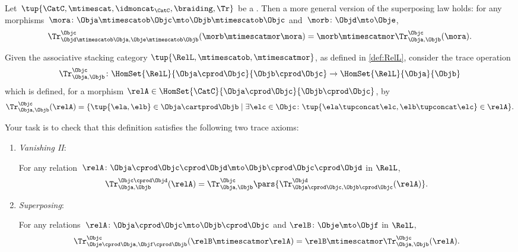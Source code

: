 \begin{lemma}
    \label{lem:general-superposing-law}
    Let~$\tup{\CatC, \mtimescat,\idmoncat_{\CatC}, \braiding, \Tr}$ be a .
    Then a more general version of the superposing law holds: for any morphisms~$\mora\colon \Obja\mtimescatob \Objc \mto \Objb \mtimescatob \Objc$ and~$\morb \colon \Objd \mto \Obje$,
    \begin{equation}
        \label{eq:superposing_2}
        \Tr_{\Objd\mtimescatob \Obja,\Obje\mtimescatob \Objb}^{\Objc}(\morb \mtimescatmor \mora)=\morb \mtimescatmor \Tr_{\Obja,\Objb}^\Objc(\mora).
    \end{equation}
\end{lemma}
\missingproof


\begin{gradedexercise}
    \label{eq:TracingRelations}

    Given the associative stacking category $\tup{\RelL, \mtimescatob, \mtimescatmor}$, as defined in \cref{def:RelL}, consider the trace operation
    $$\Tr_{\Obja,\Objb}^\Objc \colon \HomSet{\RelL}{\Obja \cprod \Objc}{\Objb \cprod \Objc}\to \HomSet{\RelL}{\Obja}{\Objb}$$
    which is defined, for a morphism $\relA \in \HomSet{\CatC}{\Obja \cprod \Objc}{\Objb\cprod \Objc}$, by
    \begin{equation}
        \Tr_{\Obja,\Objb}^\Objc(\relA) = \{ \tup{\ela, \elb} \in \Obja \cartprod \Objb \mid \exists \elc \in \Objc \colon \tup{\ela \tupconcat \elc, \elb \tupconcat \elc} \in \relA \}.
    \end{equation}

    Your task is to check that this definition satisfies the following two trace axioms:

    \begin{enumerate}

        \item \emph{Vanishing II}:

              For any relation~$\relA \colon \Obja \cprod \Objc \cprod \Objd \mto \Objb\cprod \Objc \cprod \Objd$ in $\RelL$,
              \begin{equation}
                  \Tr_{\Obja,\Objb}^{\Objc\cprod \Objd}(\relA) = \Tr_{\Obja,\Objb}^\Objc\pars{
                      \Tr_{\Obja \cprod \Objc, \Objb \cprod \Objc}^\Objd(\relA)}.
              \end{equation}

        \item \emph{Superposing}:

              For any relations~$\relA \colon \Obja\cprod \Objc \mto \Objb\cprod \Objc$ and $\relB \colon \Obje \mto \Objf$ in $\RelL$,
              \begin{equation}
                  \Tr_{\Obje\cprod \Obja,\Objf\cprod \Objb}^{\Objc}(\relB \mtimescatmor \relA) = \relB \mtimescatmor \Tr_{\Obja,\Objb}^\Objc(\relA).
              \end{equation}
    \end{enumerate}
\end{gradedexercise}

